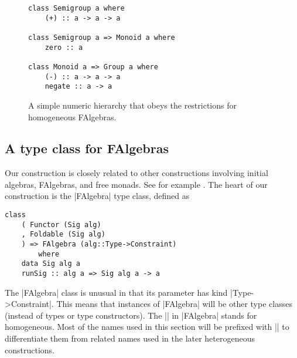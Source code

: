 \documentclass[preprint]{sigplanconf}
\theoremstyle{definition}
\begin{document}
\begin{figure}
\begin{lstlisting}
class Semigroup a where
    (+) :: a -> a -> a

class Semigroup a => Monoid a where
    zero :: a

class Monoid a => Group a where
    (-) :: a -> a -> a
    negate :: a -> a
\end{lstlisting}
\caption{A simple numeric hierarchy that obeys the restrictions for homogeneous FAlgebras.}
\label{code:group}
\end{figure}

%
%
%
%

\subsection{A type class for FAlgebras}
Our construction is closely related to other constructions involving initial algebras, FAlgebras, and free monads.
See for example \cite{swierstra2008}.
The heart of our construction is the |FAlgebra| type class, defined as
\begin{lstlisting}
class
    ( Functor (Sig alg)
    , Foldable (Sig alg)
    ) => FAlgebra (alg::Type->Constraint)
        where
    data Sig alg a
    runSig :: alg a => Sig alg a -> a
\end{lstlisting}
The |FAlgebra| class is unusual in that its parameter has kind |Type->Constraint|.
This means that instances of |FAlgebra| will be other type classes (instead of types or type constructors).
The || in |FAlgebra| stands for homogeneous.
Most of the names used in this section will be prefixed with || to differentiate them from related names used in the later heterogeneous constructions.
\end{document}
